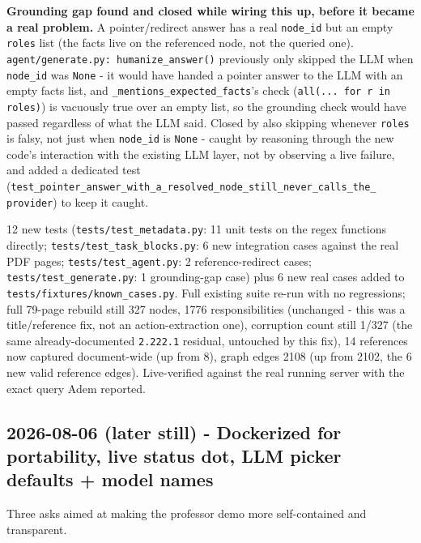 \textbf{Grounding gap found and closed while wiring this up, before it became a real problem.} A pointer/redirect answer has a real \texttt{node\_\allowbreak{}id} but an empty \texttt{roles} list (the facts live on the referenced node, not the queried one). \texttt{agent/\allowbreak{}generate.py: humanize\_\allowbreak{}answer()} previously only skipped the LLM when \texttt{node\_\allowbreak{}id} was \texttt{None} - it would have handed a pointer answer to the LLM with an empty facts list, and \texttt{\_\allowbreak{}mentions\_\allowbreak{}expected\_\allowbreak{}facts}'s check (\texttt{all(... for r in roles)}) is vacuously true over an empty list, so the grounding check would have passed regardless of what the LLM said. Closed by also skipping whenever \texttt{roles} is falsy, not just when \texttt{node\_\allowbreak{}id} is \texttt{None} - caught by reasoning through the new code's interaction with the existing LLM layer, not by observing a live failure, and added a dedicated test (\texttt{test\_\allowbreak{}pointer\_\allowbreak{}answer\_\allowbreak{}with\_\allowbreak{}a\_\allowbreak{}resolved\_\allowbreak{}node\_\allowbreak{}still\_\allowbreak{}never\_\allowbreak{}calls\_\allowbreak{}the\_\allowbreak{} provider}) to keep it caught.

12 new tests (\texttt{tests/\allowbreak{}test\_\allowbreak{}metadata.py}: 11 unit tests on the regex functions directly; \texttt{tests/\allowbreak{}test\_\allowbreak{}task\_\allowbreak{}blocks.py}: 6 new integration cases against the real PDF pages; \texttt{tests/\allowbreak{}test\_\allowbreak{}agent.py}: 2 reference-redirect cases; \texttt{tests/\allowbreak{}test\_\allowbreak{}generate.py}: 1 grounding-gap case) plus 6 new real cases added to \texttt{tests/\allowbreak{}fixtures/\allowbreak{}known\_\allowbreak{}cases.py}. Full existing suite re-run with no regressions; full 79-page rebuild still 327 nodes, 1776 responsibilities (unchanged - this was a title/reference fix, not an action-extraction one), corruption count still 1/327 (the same already-documented \texttt{2.222.1} residual, untouched by this fix), 14 references now captured document-wide (up from 8), graph edges 2108 (up from 2102, the 6 new valid reference edges). Live-verified against the real running server with the exact query Adem reported.

\subsection*{2026-08-06 (later still) - Dockerized for portability, live status dot, LLM picker defaults + model names}
Three asks aimed at making the professor demo more self-contained and transparent.

